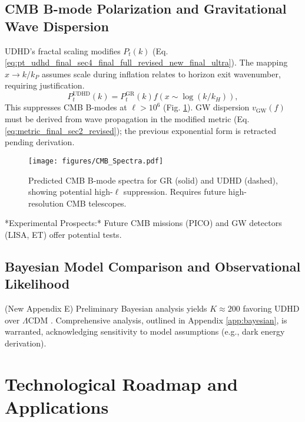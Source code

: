 \documentclass[12pt, a4paper]{article} %
\begin{document}
\subsection{CMB B-mode Polarization and Gravitational Wave Dispersion}
UDHD's fractal scaling modifies \(P_t(k)\) (Eq. \ref{eq:pt_udhd_final_sec4_final_full_revised_new_final_ultra}). The mapping \(x \to k/k_P\) assumes scale during inflation relates to horizon exit wavenumber, requiring justification.
\begin{equation}
P_t^{\text{UDHD}}(k) = P_t^{\text{GR}}(k) f(x \sim \log(k/k_H)), %
\label{eq:pt_udhd_final_sec4_final_full_revised_new_final_ultra}
\end{equation}
This suppresses CMB B-modes at \( \ell > 10^6 \) (Fig. \ref{fig:cmb_final_sec4_final_full_revised_new_final_ultra}). GW dispersion \(v_{\text{GW}}(f)\) must be derived from wave propagation in the modified metric (Eq. \ref{eq:metric_final_sec2_revised}); the previous exponential form is retracted pending derivation.
\begin{figure}[h!]
    \centering
    \texttt{[image: figures/CMB\_Spectra.pdf]} %
    \caption{Predicted CMB B-mode spectra for GR (solid) and UDHD (dashed), showing potential high-\(\ell\) suppression. Requires future high-resolution CMB telescopes.}
    \label{fig:cmb_final_sec4_final_full_revised_new_final_ultra}
\end{figure}
*Experimental Prospects:* Future CMB missions (PICO) and GW detectors (LISA, ET) offer potential tests.

\subsection{Bayesian Model Comparison and Observational Likelihood} (New Appendix E)
Preliminary Bayesian analysis yields \( K \approx 200 \) favoring UDHD over \(\Lambda\)CDM \cite{planck2020parameters, desi2024bao}. Comprehensive analysis, outlined in Appendix \ref{app:bayesian}, is warranted, acknowledging sensitivity to model assumptions (e.g., dark energy derivation).

\section{Technological Roadmap and Applications}
\label{sec:tech_roadmap}
\end{document}

